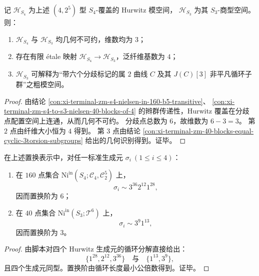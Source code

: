 \begin{corollary}\label{cor:xi-terminal-zm-hurwitz-irreducible-and-genus2-jac3torsion-moduli}
记 \(\mathcal H_{S_4}\) 为上述 \((4,2^5)\) 型 \(S_4\)-覆盖的 Hurwitz 模空间，
\(\mathcal H_{S_3}\) 为其 \(S_3\)-商型空间。则：
\begin{enumerate}
  \item \(\mathcal H_{S_4}\) 与 \(\mathcal H_{S_3}\) 均几何不可约，维数均为 \(3\)；
  \item 存在有限 \'{e}tale 映射 \(\mathcal H_{S_4}\to \mathcal H_{S_3}\)，泛纤维基数为 \(4\)；
  \item \(\mathcal H_{S_3}\) 可解释为“带六个分歧标记的属 \(2\) 曲线 \(C\) 及其 \(J(C)[3]\) 非平凡循环子群”之粗模空间。
\end{enumerate}
\end{corollary}
\begin{proof}
由结论 \ref{con:xi-terminal-zm-s4-nielsen-in-160-b5-transitive}、
\ref{con:xi-terminal-zm-s4-to-s3-nielsen-40-blocks-of-4} 的辫群传递性，Hurwitz 覆盖在分歧点配置空间上连通，从而几何不可约。
分歧点总数为 \(6\)，故维数为 \(6-3=3\)。
第 \(2\) 点由纤维大小恒为 \(4\) 得到。
第 \(3\) 点由结论 \ref{con:xi-terminal-zm-40-blocks-equal-cyclic-3torsion-subgroups} 给出的几何识别得到。证毕。
\end{proof}

\begin{proposition}\label{prop:xi-terminal-zm-hurwitz-generator-cycle-types-on-160-and-40}
在上述置换表示中，对任一标准生成元 \(\sigma_i\ (1\le i\le 4)\)：
\begin{enumerate}
  \item 在 \(160\) 点集合 \(\mathrm{Ni}^{\mathrm{in}}(S_4;\mathcal C_4,\mathcal C_2^5)\) 上，
  \[
  \sigma_i\sim 3^{36}2^{12}1^{28},
  \]
  因而置换阶为 \(6\)；
  \item 在 \(40\) 点集合 \(\mathrm{Ni}^{\mathrm{in}}(S_3;\mathcal T^6)\) 上，
  \[
  \sigma_i\sim 3^{9}1^{13},
  \]
  因而置换阶为 \(3\)。
\end{enumerate}
\end{proposition}
\begin{proof}
由脚本对四个 Hurwitz 生成元的循环分解直接给出：
\[
\{1^{28},2^{12},3^{36}\}\quad\text{与}\quad \{1^{13},3^{9}\},
\]
且四个生成元同型。置换阶由循环长度最小公倍数得到。证毕。
\end{proof}

